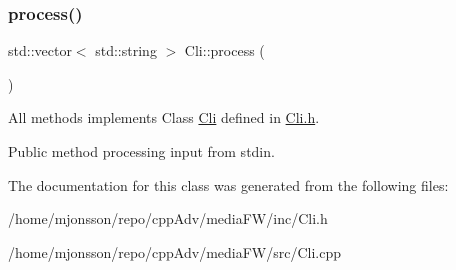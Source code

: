 \subsubsection{\texorpdfstring{process()}{process()}}
{\footnotesize\ttfamily std\+::vector$<$ std\+::string $>$ Cli\+::process (\begin{DoxyParamCaption}{ }\end{DoxyParamCaption})\hspace{0.3cm}{\ttfamily [virtual]}}



All methods implements Class \hyperlink{classCli}{Cli} defined in \hyperlink{Cli_8h_source}{Cli.\+h}. 

Public method processing input from stdin. 

The documentation for this class was generated from the following files\+:\begin{DoxyCompactItemize}
\item 
/home/mjonsson/repo/cpp\+Adv/media\+F\+W/inc/Cli.\+h\item 
/home/mjonsson/repo/cpp\+Adv/media\+F\+W/src/Cli.\+cpp\end{DoxyCompactItemize}
